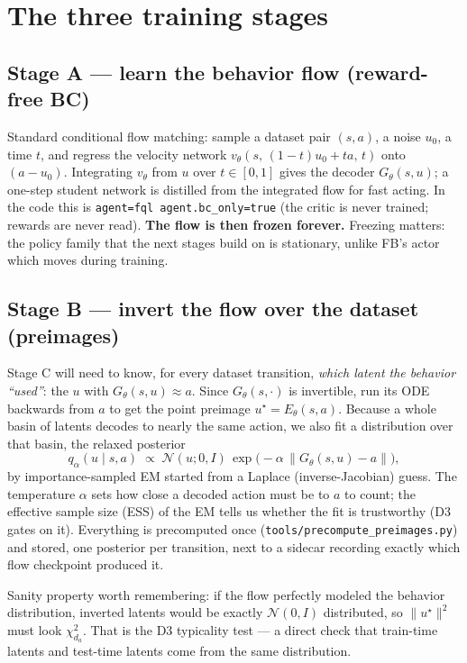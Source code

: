 \documentclass[11pt]{article}
\begin{document}
\section{The three training stages}

\subsection{Stage A --- learn the behavior flow (reward-free BC)}

Standard conditional flow matching: sample a dataset pair $(s,a)$, a noise $u_0$, a time
$t$, and regress the velocity network $v_\theta(s,\,(1-t)u_0+ta,\,t)$ onto $(a-u_0)$.
Integrating $v_\theta$ from $u$ over $t\in[0,1]$ gives the decoder $G_\theta(s,u)$; a
one-step student network is distilled from the integrated flow for fast acting. In the
code this is \texttt{agent=fql agent.bc\_only=true} (the critic is never trained; rewards
are never read). \textbf{The flow is then frozen forever.} Freezing matters: the policy
family that the next stages build on is stationary, unlike FB's actor which moves during
training.

\subsection{Stage B --- invert the flow over the dataset (preimages)}

Stage C will need to know, for every dataset transition, \emph{which latent the behavior
``used''}: the $u$ with $G_\theta(s,u)\approx a$. Since $G_\theta(s,\cdot)$ is
invertible, run its ODE backwards from $a$ to get the point preimage
$u^\star=E_\theta(s,a)$. Because a whole basin of latents decodes to nearly the same
action, we also fit a distribution over that basin, the relaxed posterior
\[
  q_\alpha(u\mid s,a)\;\propto\;
  \mathcal{N}(u;0,I)\,\exp\!\bigl(-\alpha\,\|G_\theta(s,u)-a\|\bigr),
\]
by importance-sampled EM started from a Laplace (inverse-Jacobian) guess. The
temperature $\alpha$ sets how close a decoded action must be to $a$ to count; the
effective sample size (ESS) of the EM tells us whether the fit is trustworthy (D3 gates
on it). Everything is precomputed once (\texttt{tools/precompute\_preimages.py}) and
stored, one posterior per transition, next to a sidecar recording exactly which flow
checkpoint produced it.

Sanity property worth remembering: if the flow perfectly modeled the behavior
distribution, inverted latents would be exactly $\mathcal{N}(0,I)$ distributed, so
$\|u^\star\|^2$ must look $\chi^2_{d_a}$. That is the D3 typicality test --- a direct
check that train-time latents and test-time latents come from the same distribution.
\end{document}
